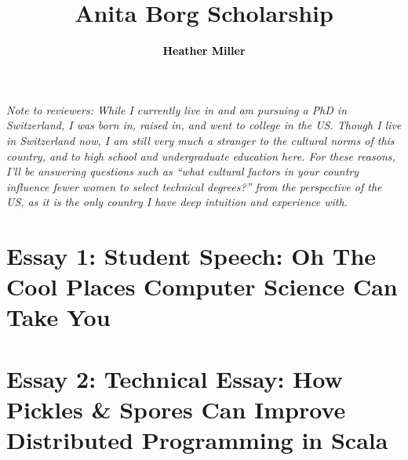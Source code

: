 \documentclass[acmtocl]{acmtrans2m}
\title{{\color{Black}Anita Borg Scholarship}}
\author{\textcolor{Black}{\textbf{Heather Miller}}}
\begin{document}
\setmonofont[Mapping=tex-text,Scale=0.9]{Inconsolata}
%
\maketitle

{\em Note to reviewers: While I currently live in and am pursuing a PhD in
Switzerland, I was born in, raised in, and went to college in the US. Though I
live in Switzerland now, I am still very much a stranger to the cultural norms
of this country, and to high school and undergraduate education here. For
these reasons, I'll be answering questions such as ``what cultural factors in
your country influence fewer women to select technical degrees?'' from the
perspective of the US, as it is the only country I have deep intuition and
experience with.}

\section*{\textbf{Essay 1:} Student Speech: Oh The Cool Places Computer Science Can Take You}





\section*{\textbf{Essay 2:} Technical Essay: How Pickles \& Spores Can Improve Distributed Programming in Scala}

\end{document}

